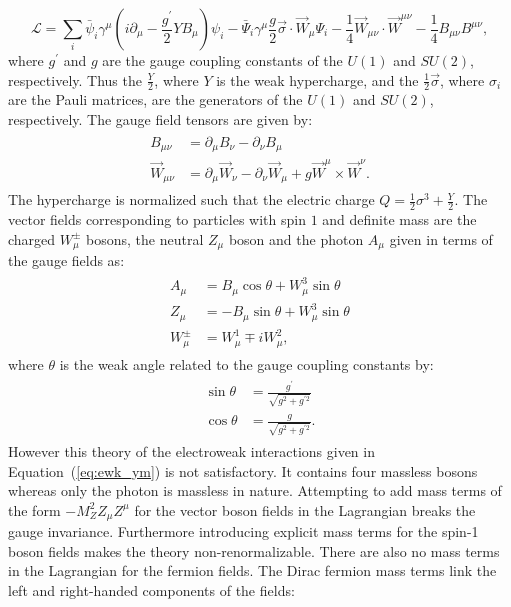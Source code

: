 \begin{equation} \label{eq:ewk_ym}
\mathcal{L} = \sum_{i} \bar{\psi}_{i} \gamma^{\mu}(i \partial_{\mu}-\frac{g^{'}}{2}YB_{\mu}) \psi_{i}  - \bar{\Psi}_{i}\gamma^{\mu}\frac{g}{2}\vec{\sigma}\cdot\vec{W}_{\mu}\Psi_{i} - \frac{1}{4}\vec{W}_{\mu\nu}\cdot\vec{W}^{\mu\nu} - \frac{1}{4} B_{\mu\nu} B^{\mu\nu},
\end{equation}
where $g^{'}$ and $g$ are the gauge coupling constants of the $U(1)$ and $SU(2)$, respectively. Thus the $\frac{Y}{2}$, where $Y$ is the weak hypercharge, and the $\frac{1}{2}\vec{\sigma}$, where $\sigma_{i}$ are the Pauli matrices, are the generators of the $U(1)$ and $SU(2)$, respectively. The gauge field tensors are given by:
\begin{eqnarray} \label{eq:ewk_field}
\begin{aligned}
B_{\mu\nu} &= \partial_{\mu}B_{\nu}-\partial_{\nu}B_{\mu}  \\
\vec{W}_{\mu\nu} &=  \partial_{\mu}\vec{W}_{\nu}-\partial_{\nu}\vec{W}_{\mu} + g \vec{W}^{\mu} \times \vec{W}^{\nu}.
\end{aligned}
\end{eqnarray}
The hypercharge is normalized such that the electric charge $Q=\frac{1}{2}\sigma^3+\frac{Y}{2}$. The vector fields corresponding to particles with spin $1$ and definite mass are the charged $W^{\pm}_{\mu}$ bosons, the neutral $Z_{\mu}$ boson and the photon $A_{\mu}$ given in terms of the gauge fields as: 
\begin{eqnarray} \label{eq:bosons}
\begin{aligned}
A_{\mu} &= B_{\mu} \cos \theta + W_{\mu}^{3} \sin \theta \\
Z_{\mu} &= -B_{\mu} \sin \theta + W_{\mu}^{3} \sin \theta \\
W_{\mu}^{\pm} &= W^{1}_{\mu} \mp i W_{\mu}^{2},
\end{aligned}
\end{eqnarray}
where $\theta$ is the weak angle related to the gauge coupling constants by:
\begin{eqnarray} \label{eq:coupling}
\begin{aligned}
\sin \theta &= \frac{g^{'}}{\sqrt{g^2+g^{'2}}} \\
\cos \theta &= \frac{g}{\sqrt{g^2+g^{'2}}}.
\end{aligned}
\end{eqnarray}
However this theory of the electroweak interactions given in Equation~(\ref{eq:ewk_ym}) is not satisfactory. It contains four massless bosons whereas only the photon is massless in nature. Attempting to add mass terms of the form $-M_{Z}^2Z_{\mu}Z^{\mu}$ for the vector boson fields in the Lagrangian breaks the gauge invariance. Furthermore introducing explicit mass terms for the spin-1 boson fields makes the theory non-renormalizable. There are also no mass terms in the Lagrangian for the fermion fields.  The Dirac fermion mass terms link the left and right-handed components of the fields:
